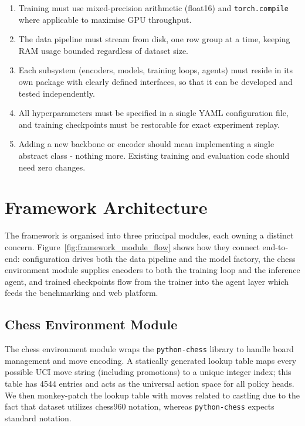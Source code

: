 \begin{enumerate}
    \item Training must use mixed-precision arithmetic (float16) and \texttt{torch.compile} where applicable to maximise GPU throughput.
    \item The data pipeline must stream from disk, one row group at a time, keeping RAM usage bounded regardless of dataset size.
    \item Each subsystem (encoders, models, training loops, agents) must reside in its own package with clearly defined interfaces, so that it can be developed and tested independently.
    \item All hyperparameters must be specified in a single YAML configuration file, and training checkpoints must be restorable for exact experiment replay.
    \item Adding a new backbone or encoder should mean implementing a single abstract class - nothing more. Existing training and evaluation code should need zero changes.
\end{enumerate}

\section{Framework Architecture}

The framework is organised into three principal modules, each owning a distinct concern. Figure~\ref{fig:framework_module_flow} shows how they connect end-to-end: configuration drives both the data pipeline and the model factory, the chess environment module supplies encoders to both the training loop and the inference agent, and trained checkpoints flow from the trainer into the agent layer which feeds the benchmarking and web platform.


\subsection{Chess Environment Module}

The chess environment module wraps the \texttt{python-chess} library to handle board management and move encoding. A statically generated lookup table maps every possible UCI move string (including promotions) to a unique integer index; this table has 4544 entries and acts as the universal action space for all policy heads. We then monkey-patch the lookup table with moves related to castling due to the fact that dataset utilizes chess960 notation, whereas \texttt{python-chess} expects standard notation.

